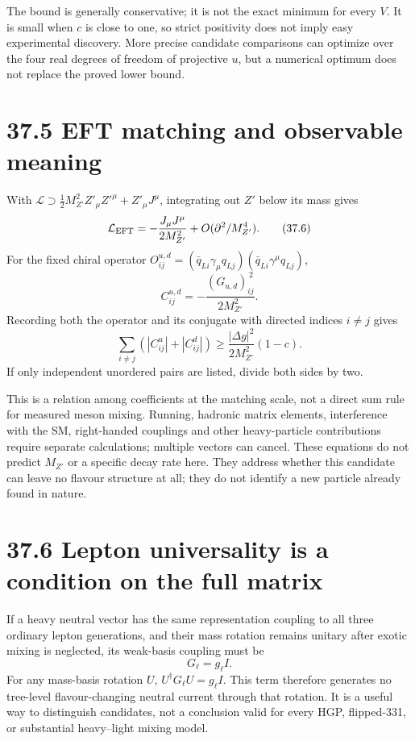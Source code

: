 \documentclass[
  11pt,
  oneside]{book}
\begin{document}
The bound is generally conservative; it is not the exact minimum for
every \(V\). It is small when \(c\) is close to one, so strict
positivity does not imply easy experimental discovery. More precise
candidate comparisons can optimize over the four real degrees of freedom
of projective \(u\), but a numerical optimum does not replace the proved
lower bound.

\section{37.5 EFT matching and observable meaning}

With \(\mathcal L\supset \tfrac12M_{Z'}^2Z'_\mu Z'^\mu+Z'_\mu J^\mu\),
integrating out \(Z'\) below its mass gives \[
\mathcal L_{\rm EFT}=-\frac{J_\mu J^\mu}{2M_{Z'}^2}
+O(\partial^2/M_{Z'}^4).
\tag{37.6}
\] For the fixed chiral operator
\(O_{ij}^{u,d}=(\bar q_{Li}\gamma_\mu q_{Lj})
(\bar q_{Li}\gamma^\mu q_{Lj})\), \[
C_{ij}^{u,d}=-\frac{(G_{u,d})_{ij}^{\,2}}{2M_{Z'}^2}.
\tag{37.7}
\] Recording both the operator and its conjugate with directed indices
\(i\ne j\) gives \[
\sum_{i\ne j}(|C_{ij}^u|+|C_{ij}^d|)
\ge\frac{|\Delta g|^2}{2M_{Z'}^2}(1-c).
\tag{37.8}
\] If only independent unordered pairs are listed, divide both sides by
two.

This is a relation among coefficients at the matching scale, not a
direct sum rule for measured meson mixing. Running, hadronic matrix
elements, interference with the SM, right-handed couplings and other
heavy-particle contributions require separate calculations; multiple
vectors can cancel. These equations do not predict \(M_{Z'}\) or a
specific decay rate here. They address whether this candidate can leave
no flavour structure at all; they do not identify a new particle already
found in nature.

\section{37.6 Lepton universality is a condition on the full matrix}

If a heavy neutral vector has the same representation coupling to all
three ordinary lepton generations, and their mass rotation remains
unitary after exotic mixing is neglected, its weak-basis coupling must
be \[
G_\ell=g_\ell I.
\] For any mass-basis rotation \(U\), \(U^\dagger G_\ell U=g_\ell I\).
This term therefore generates no tree-level flavour-changing neutral
current through that rotation. It is a useful way to distinguish
candidates, not a conclusion valid for every HGP, flipped-331, or
substantial heavy--light mixing model.
\end{document}
